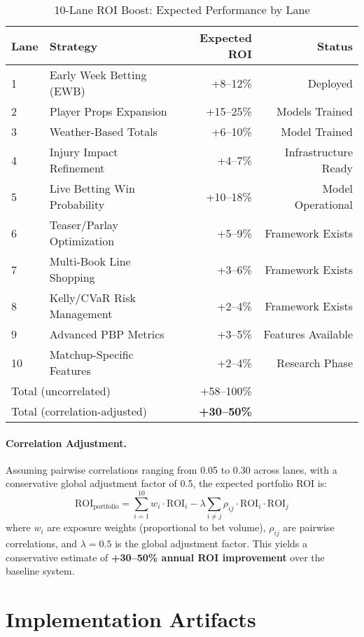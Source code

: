 \begin{table}[htbp]
\centering
\caption{10-Lane ROI Boost: Expected Performance by Lane}
\label{tab:lanes-summary}
\begin{tabular}{@{} l l r r @{}}
\toprule
 \textbf{Lane} & \textbf{Strategy} & \textbf{Expected ROI} & \textbf{Status} \\
\midrule
1 & Early Week Betting (EWB) & +8--12\% & Deployed \\
2 & Player Props Expansion & +15--25\% & Models Trained \\
3 & Weather-Based Totals & +6--10\% & Model Trained \\
4 & Injury Impact Refinement & +4--7\% & Infrastructure Ready \\
5 & Live Betting Win Probability & +10--18\% & Model Operational \\
6 & Teaser/Parlay Optimization & +5--9\% & Framework Exists \\
7 & Multi-Book Line Shopping & +3--6\% & Framework Exists \\
8 & Kelly/CVaR Risk Management & +2--4\% & Framework Exists \\
9 & Advanced PBP Metrics & +3--5\% & Features Available \\
10 & Matchup-Specific Features & +2--4\% & Research Phase \\
\midrule
\multicolumn{2}{l}{Total (uncorrelated)} & +58--100\% & \\
\multicolumn{2}{l}{Total (correlation-adjusted)} & \textbf{+30--50\%} & \\
\bottomrule
\end{tabular}
\end{table}

\paragraph{Correlation Adjustment.}
Assuming pairwise correlations ranging from 0.05 to 0.30 across lanes, with a conservative global adjustment factor of 0.5, the expected portfolio ROI is:
\[
\text{ROI}_{\text{portfolio}} = \sum_{i=1}^{10} w_i \cdot \text{ROI}_i - \lambda \sum_{i \neq j} \rho_{ij} \cdot \text{ROI}_i \cdot \text{ROI}_j
\]
where $w_i$ are exposure weights (proportional to bet volume), $\rho_{ij}$ are pairwise correlations, and $\lambda = 0.5$ is the global adjustment factor. This yields a conservative estimate of \textbf{+30--50\% annual ROI improvement} over the baseline system.

\section{Implementation Artifacts}

